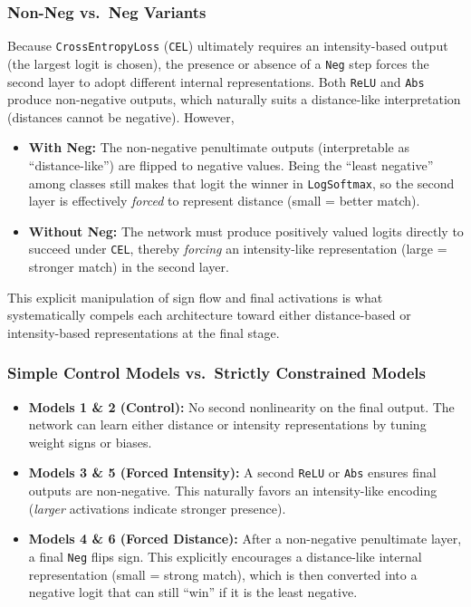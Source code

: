 \subsubsection{Non-Neg vs.\ Neg Variants}
\label{sec:nonneg_neg}
Because \texttt{CrossEntropyLoss} (\texttt{CEL}) ultimately requires an intensity-based output (the largest logit is chosen), the presence or absence of a \texttt{Neg} step forces the second layer to adopt different internal representations. Both \texttt{ReLU} and \texttt{Abs} produce non-negative outputs, which naturally suits a distance-like interpretation (distances cannot be negative). However, 
\begin{itemize}
    \item \textbf{With Neg:} The non-negative penultimate outputs (interpretable as “distance-like”) are flipped to negative values. Being the “least negative” among classes still makes that logit the winner in \texttt{LogSoftmax}, so the second layer is effectively \emph{forced} to represent distance (small = better match).  
    \item \textbf{Without Neg:} The network must produce positively valued logits directly to succeed under \texttt{CEL}, thereby \emph{forcing} an intensity-like representation (large = stronger match) in the second layer.
\end{itemize}
This explicit manipulation of sign flow and final activations is what systematically compels each architecture toward either distance-based or intensity-based representations at the final stage.


\subsubsection{Simple Control Models vs.\ Strictly Constrained Models}
\label{sec:control_forced}
\begin{itemize}
    \item \textbf{Models 1 \& 2 (Control):} No second nonlinearity on the final output. The network can learn either distance or intensity representations by tuning weight signs or biases.
    \item \textbf{Models 3 \& 5 (Forced Intensity):} A second \texttt{ReLU} or \texttt{Abs} ensures final outputs are non-negative. This naturally favors an intensity-like encoding (\emph{larger} activations indicate stronger presence).
    \item \textbf{Models 4 \& 6 (Forced Distance):} After a non-negative penultimate layer, a final \texttt{Neg} flips sign. This explicitly encourages a distance-like internal representation (small = strong match), which is then converted into a negative logit that can still ``win'' if it is the least negative.
\end{itemize}

